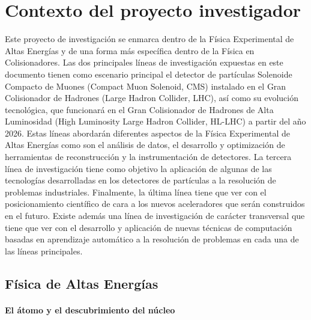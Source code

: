 \section{Contexto del proyecto investigador}

Este proyecto de investigación se enmarca dentro de la Física Experimental de Altas Energías y de una forma más específica dentro de la Física en Colisionadores. Las dos principales líneas de investigación expuestas en este documento tienen como escenario principal el detector de partículas Solenoide Compacto de Muones (Compact Muon Solenoid, CMS) instalado en el Gran Colisionador de Hadrones (Large Hadron Collider, LHC), así como su evolución tecnológica, que funcionará en el Gran Colisionador de Hadrones de Alta Luminosidad (High Luminosity Large Hadron Collider, HL-LHC) a partir del año 2026. Estas líneas abordarán diferentes aspectos de la Física Experimental de Altas Energías como son el análisis de datos, el desarrollo y optimización de herramientas de reconstrucción y la instrumentación de detectores. La tercera línea de investigación tiene como objetivo la aplicación de algunas de las tecnologías desarrolladas en los detectores de partículas a la resolución de problemas industriales. Finalmente, la última línea tiene que ver con el posicionamiento científico de cara a los nuevos aceleradores que serán construidos en el futuro. Existe además una línea de investigación de carácter transversal que tiene que ver con el desarrollo y aplicación de nuevas técnicas de computación basadas en aprendizaje automático a la resolución de problemas en cada una de las líneas principales. 

\subsection{Física de Altas Energías}


\paragraph{El átomo y el descubrimiento del núcleo\\\\}

